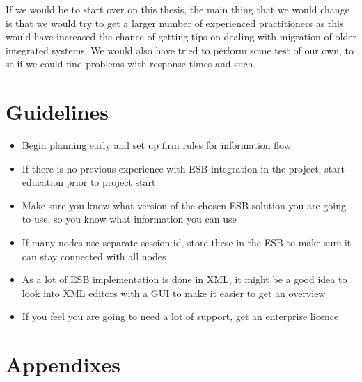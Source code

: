 \documentclass{llncs}
\begin{document}
If we would be to start over on this thesis, the main thing that we would change is that we would try to get a larger number of experienced practitioners as this would have increased the chance of getting tips on dealing with migration of older integrated systems. We would also have tried to perform some test of our own, to se if we could find problems with response times and such.

\section{Guidelines}
\begin{itemize}
\item Begin planning early and set up firm rules for information flow
\item If there is no previous experience with ESB integration in the project, start education prior to project start
\item Make sure you know what version of the chosen ESB solution you are going to use, so you know what information you can use
\item If many nodes use separate session id, store these in the ESB to make sure it can stay connected with all nodes
\item As a lot of ESB implementation is done in XML, it might be a good idea to look into XML editors with a GUI to make it easier to get an overview
\item If you feel you are going to need a lot of support, get an enterprise licence
\end{itemize}

\newpage



\newpage
\section*{Appendixes}
\appendix


\end{document}
